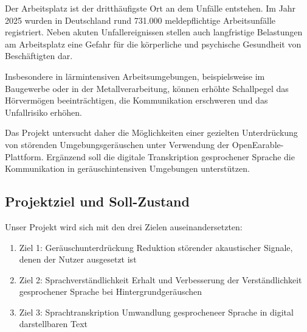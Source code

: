 \documentclass{article}
\begin{document}
Der Arbeitsplatz ist der dritthäufigste Ort an dem Unfälle entstehen. Im Jahr 2025 wurden in Deutschland rund 731.000 meldepflichtige Arbeitsunfälle registriert. Neben akuten Unfallereignissen stellen auch langfristige Belastungen am Arbeitsplatz eine Gefahr für die körperliche und psychische Gesundheit von Beschäftigten dar. 

Insbesondere in lärmintensiven Arbeitsumgebungen, beispielsweise im Baugewerbe oder in der Metallverarbeitung, können erhöhte Schallpegel das Hörvermögen beeinträchtigen, die Kommunikation erschweren und das Unfallrisiko erhöhen.

Das Projekt untersucht daher die Möglichkeiten einer gezielten Unterdrückung von störenden Umgebungsgeräuschen unter Verwendung der OpenEarable-Plattform. Ergänzend soll die digitale Transkription gesprochener Sprache die Kommunikation in geräuschintensiven Umgebungen unterstützen.

\subsection{Projektziel und Soll-Zustand}
Unser Projekt wird sich mit den drei Zielen auseinandersetzten:
\begin{enumerate}
    \item Ziel 1: Geräuschunterdrückung
    \subitem Reduktion störender akaustischer Signale, denen der Nutzer ausgesetzt ist
    \item Ziel 2: Sprachverständlichkeit
    \subitem Erhalt und Verbesserung der Verständlichkeit gesprochener Sprache bei Hintergrundgeräuschen
    \item Ziel 3: Sprachtranskription
    \subitem Umwandlung gesprocheneer Sprache in digital darstellbaren Text
\end{enumerate}
\end{document}
